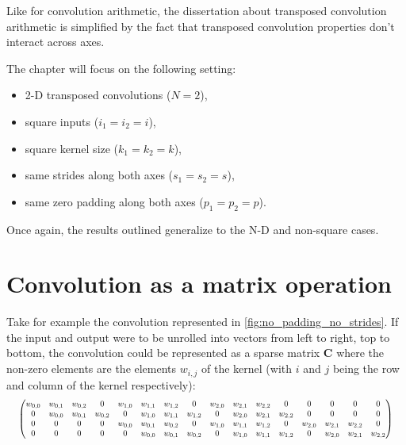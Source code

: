 Like for convolution arithmetic, the dissertation about transposed convolution
arithmetic is simplified by the fact that transposed convolution properties
don't interact across axes.

The chapter will focus on the following setting:

\begin{itemize}
    \item 2-D transposed convolutions ($N = 2$),
    \item square inputs ($i_1 = i_2 = i$),
    \item square kernel size ($k_1 = k_2 = k$),
    \item same strides along both axes ($s_1 = s_2 = s$),
    \item same zero padding along both axes ($p_1 = p_2 = p$).
\end{itemize}

\noindent Once again, the results outlined generalize to the N-D and non-square
cases.

\section{Convolution as a matrix operation}

Take for example the convolution represented in
\autoref{fig:no_padding_no_strides}. If the input and output were to be unrolled
into vectors from left to right, top to bottom, the convolution could be
represented as a sparse matrix $\mathbf{C}$ where the non-zero elements are the
elements $w_{i,j}$ of the kernel (with $i$ and $j$ being the row and column of
the kernel respectively):
\begin{equation*}
\setcounter{MaxMatrixCols}{20}
\resizebox{.98\hsize}{!}{$%
    \begin{pmatrix}%
    w_{0,0} & w_{0,1} & w_{0,2} & 0       & w_{1,0} & w_{1,1} & w_{1,2} & 0       &
    w_{2,0} & w_{2,1} & w_{2,2} & 0       & 0       & 0       & 0       & 0       \\
    0       & w_{0,0} & w_{0,1} & w_{0,2} & 0       & w_{1,0} & w_{1,1} & w_{1,2} &
    0       & w_{2,0} & w_{2,1} & w_{2,2} & 0       & 0       & 0       & 0       \\
    0       & 0       & 0       & 0       & w_{0,0} & w_{0,1} & w_{0,2} & 0       &
    w_{1,0} & w_{1,1} & w_{1,2} & 0       & w_{2,0} & w_{2,1} & w_{2,2} & 0       \\
    0       & 0       & 0       & 0       & 0       & w_{0,0} & w_{0,1} & w_{0,2} &
    0       & w_{1,0} & w_{1,1} & w_{1,2} & 0       & w_{2,0} & w_{2,1} & w_{2,2} \\
    \end{pmatrix}$}
\end{equation*}

